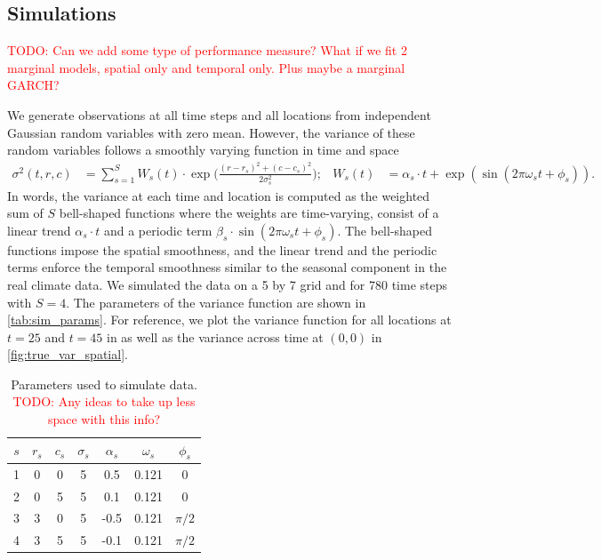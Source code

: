 \documentclass{article}
\newcommand{\attn}[1]{\textcolor{red}{TODO: #1}}
\begin{document}
\subsection{Simulations}
\label{sec:simulations}

\attn{Can we add some type of performance measure? What if we fit 2
  marginal models, spatial only and temporal only. Plus maybe a
  marginal GARCH?}

We generate observations at all time steps and all locations from
independent Gaussian random variables with zero mean. However, the
variance of these random variables follows a smoothly varying function
in time and space
\begin{align}
\sigma^2(t,r,c) & =\sum_{s=1}^{S} W_s(t) \cdot \exp\bigg( \frac{(r-r_s)^2+(c-c_s)^2}{2\sigma_s^2} \bigg); &
W_s(t) & =\alpha_s \cdot t + \exp(\sin(2\pi\omega_s t+\phi_s)) .
\label{eq:sourceVar}
\end{align}
In words, the variance at each time and location is computed as the
weighted sum of $S$ bell-shaped functions where the weights are
time-varying, consist of a linear trend $\alpha_s \cdot t$ and a
periodic term $\beta_s \cdot \sin(2\pi\omega_s t+\phi_s)$. The
bell-shaped functions impose the spatial smoothness, and the linear
trend and the periodic terms enforce the temporal smoothness similar
to the seasonal component in the real climate data. We
simulated the data on a 5 by 7 grid and for 780 time steps with
$S=4$. The parameters of the variance function are shown in
\autoref{tab:sim_params}. For reference, we plot the variance function for all
locations at $t=25$ and $t=45$ in
as well as
the variance across time at $(0,0)$ in
\autoref{fig:true_var_spatial}.

\begin{table}[tb]
  \caption{Parameters used to simulate data. \attn{Any ideas to take
      up less space with this info?}}
  \label{tab:sim_params}
  \begin{center}
    \begin{tabular}{ccccccc}
      \hline
      $s$ & $r_s$ & $c_s$ & $\sigma_s$ &$\alpha_s$ & $\omega_s$ & $\phi_s$\\
      \hline
      1 & 0 & 0 & 5 & 0.5 & 0.121 & 0 \\
      2 & 0 & 5 & 5 & 0.1 & 0.121 & 0 \\
      3 & 3 & 0 & 5 & -0.5 & 0.121 & $\pi/2$ \\
      4 & 3 & 5 & 5 & -0.1 & 0.121 & $\pi/2$ \\
      \hline
    \end{tabular}
  \end{center}
\end{table} 
\end{document}

